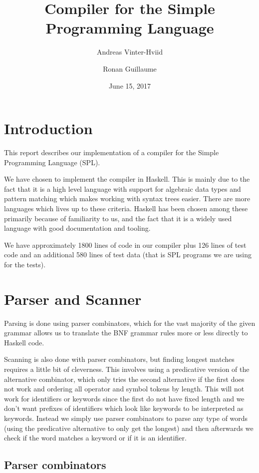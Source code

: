 \documentclass{scrartcl}
\title{Compiler for the Simple Programming Language}
\author{Andreas Vinter-Hviid \and Ronan Guillaume}
\date{June 15, 2017}
\begin{document}
\maketitle

\tableofcontents

\section{Introduction}
This report describes our implementation of a compiler for the Simple
Programming Language (SPL).

We have chosen to implement the compiler in Haskell. This is mainly
due to the fact that it is a high level language with
support for algebraic data types and pattern matching
which makes working with syntax trees easier. There are more languages
which lives up to these criteria. Haskell has been chosen among
these primarily because of familiarity to us, and the fact that it is
a widely used language with good documentation and tooling.

We have approximately 1800 lines of code in our compiler plus 126 lines
of test code and an additional 580 lines of test data (that is SPL
programs we are using for the tests).
\section{Parser and Scanner}
Parsing is done using parser combinators, which for the vast 
majority of the given grammar allows us to translate the BNF
grammar rules more or less directly to
Haskell code.

Scanning is also done with parser combinators, but finding longest
matches requires a little bit of cleverness. This involves using a
predicative version of the alternative combinator, which only tries
the second alternative if the first does not work and ordering all
operator and symbol tokens by length. This will not work for 
identifiers or keywords since the first do not have fixed length and
we don't want prefixes of identifiers which look like keywords to be
interpreted as keywords. Instead we simply use parser combinators
to parse any type of words (using the predicative alternative to 
only get the longest) and then afterwards we check if the word matches
a keyword or if it is an identifier.

\subsection{Parser combinators}
\end{document}
